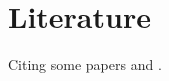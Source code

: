 
\section{Literature}

Citing some papers \textcite{axelrod1981evolution} and \textcite{rothschild1976equilibrium}.
